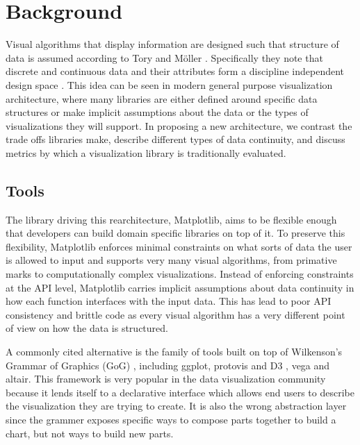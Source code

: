 \documentclass[../main.tex]{subfiles}
\begin{document}
\section{Background}
Visual algorithms that display information are designed such that structure of data is assumed according to Tory and Möller  \cite{toryRethinkingVisualizationHighLevel2004}. Specifically they note that discrete and continuous data and their attributes form a discipline independent design space \cite{pousmanCasualInformation2007}. This idea can be seen in modern general purpose visualization architecture,  where many libraries are either defined around specific data structures or make implicit assumptions about the data or the types of visualizations they will support. In proposing a new architecture, we contrast the trade offs libraries make, describe different types of data continuity, and discuss metrics by which a visualization library is traditionally evaluated. 

\subsection{Tools}
\label{sec:intro_data_tools}
The library driving this rearchitecture, Matplotlib, aims to be flexible enough that developers can build domain specific libraries on top of it. To preserve this flexibility, Matplotlib enforces minimal constraints on what sorts of data the user is allowed to input and supports very many visual algorithms, from primative marks to computationally complex visualizations. Instead of enforcing constraints at the API level, Matplotlib carries implicit assumptions about data continuity in how each function interfaces with the input data. This has lead to poor API consistency and brittle code as every visual algorithm has a very different point of view on how the data is structured. 

A commonly cited alternative is the family of tools built on top of Wilkenson's Grammar of Graphics (GoG) \cite{wilkinsonGrammarGraphics2005}, including ggplot\cite{wickhamGgplot2ElegantGraphics2016a}, protovis\cite{bostockProtoviz2009} and D3 \cite{bostockDataDrivenDocuments2011}, vega\cite{satyanarayanDeclarativeInteractionDesign2014} and altair\cite{vanderplasAltairInteractiveStatistical2018}. This framework is very popular in the data visualization community because it lends itself to a declarative interface \cite{heerDeclarative2010} which allows end users to describe the visualization they are trying to create. It is also the wrong abstraction layer since the grammer exposes specific ways to compose parts together to build a chart, but not ways to build new parts\cite{wongsuphasawatNavigatingWideWorld2021}. 
\end{document}
